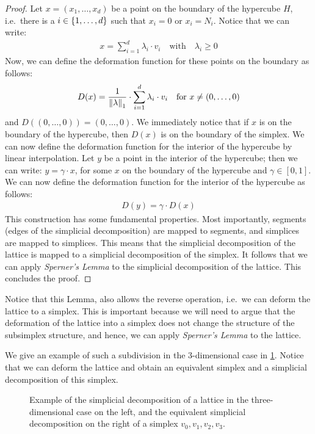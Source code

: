 \begin{proof}
	Let $x = (x_1, \dots, x_d)$ be a point on the boundary of the hypercube $H$, i.e.\ there is a $i \in \left\{1, \dots, d\right\}$ such that $x_i = 0$ or $x_i = N_i$. Notice that we can write:
	\begin{align*}
		x = \sum_{i=1}^{d} \lambda_i \cdot v_i \quad \text{with} \quad \lambda_i \geq 0
	\end{align*}
	Now, we can define the deformation function for these points on the boundary as follows:
	\begin{align*}
		D(x) = \frac{1}{\left\lVert\lambda\right\rVert_1} \cdot \sum_{i=1}^{d} \lambda_i \cdot v_i \quad \text{for $x \neq (0, \dots, 0)$}
	\end{align*}
	and $D((0, \dots, 0)) = (0, \dots, 0)$. We immediately notice that if $x$ is on the boundary of the hypercube, then $D(x)$ is on the boundary of the simplex. We can now define the deformation function for the interior of the hypercube by linear interpolation. Let $y$ be a point in the interior of the hypercube; then we can write: $y = \gamma \cdot x$, for some $x$ on the boundary of the hypercube and $\gamma \in [0, 1]$. We can now define the deformation function for the interior of the hypercube as follows:
	\begin{align*}
		D(y) = \gamma \cdot D(x)
	\end{align*}
	This construction has some fundamental properties. Most importantly, segments (edges of the simplicial decomposition) are mapped to segments, and simplices are mapped to simplices. This means that the simplicial decomposition of the lattice is mapped to a simplicial decomposition of the simplex. It follows that we can apply \textit{Sperner's Lemma} to the simplicial decomposition of the lattice. This concludes the proof.
\end{proof}

Notice that this Lemma, also allows the reverse operation, i.e.\ we can deform the lattice to a simplex. This is important because we will need to argue that the deformation of the lattice into a simplex does not change the structure of the subsimplex structure, and hence, we can apply \textit{Sperner's Lemma} to the lattice.

We give an example of such a subdivision in the 3-dimensional case in \cref{fig:sperner_lattice_example}. Notice that we can deform the lattice and obtain an equivalent simplex and a simplicial decomposition of this simplex.

\begin{figure}
	\centering
	\caption[Example of a simplicial decomposition of a lattice]{Example of the simplicial decomposition of a lattice in the three-dimensional case on the left, and the equivalent simplicial decomposition on the right of a simplex $v_0, v_1, v_2, v_3$.}\label{fig:sperner_lattice_example}
\end{figure}


